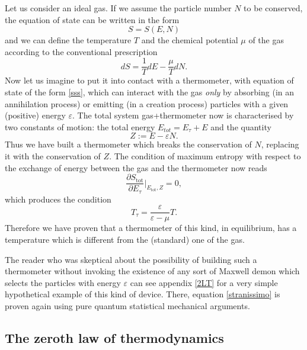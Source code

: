 \documentclass[twocolumn,usenatbib]{mnras2}
\begin{document}
Let us consider an ideal gas. If we assume the particle number $N$ to be conserved, the equation of state can be written in the form
\begin{equation}
S =S(E,N)
\end{equation}
and we can define the temperature $T$ and the chemical potential $\mu$ of the gas according to the conventional prescription
\begin{equation}
dS = \dfrac{1}{T} dE - \dfrac{\mu}{T} dN.
\end{equation}
Now let us imagine to put it into contact with a thermometer, with equation of state of the form \eqref{sss}, which can interact with the gas \textit{only} by absorbing (in an annihilation process) or emitting (in a creation process) particles with a given (positive) energy $\varepsilon$. The total system gas+thermometer now is characterised by two constants of motion: the total energy $E_{tot}= E_\tau + E$ and the quantity
\begin{equation}\label{iorestoferma}
Z := E-\varepsilon N. 
\end{equation}
Thus we have built a thermometer which breaks the conservation of $N$, replacing it with the conservation of $Z$. The condition of maximum entropy with respect to the exchange of energy between the gas and the thermometer now reads
\begin{equation}
\dfrac{\partial S_{\text{tot}}}{\partial E_\tau} \bigg|_{E_\text{tot},Z} =0,
\end{equation} 
which produces the condition
\begin{equation}\label{stranissimo}
T_\tau = \dfrac{\varepsilon}{\varepsilon - \mu} T.
\end{equation}
Therefore we have proven that a thermometer of this kind, in equilibrium, has a temperature which is different from the (standard) one of the gas. 

The reader who was skeptical about the possibility of building such a thermometer without invoking the existence of any sort of Maxwell demon which selects the particles with energy $\varepsilon$ can see appendix \ref{2LT} for a very simple hypothetical example of this kind of device. There, equation \eqref{stranissimo} is proven again using pure quantum statistical mechanical arguments.


\subsection{The zeroth law of thermodynamics}\label{0thlaw}
\end{document}

